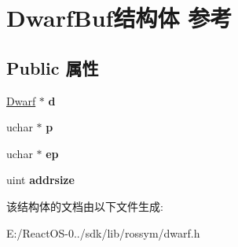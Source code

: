 \hypertarget{struct_dwarf_buf}{}\section{Dwarf\+Buf结构体 参考}
\label{struct_dwarf_buf}
\subsection*{Public 属性}
\begin{DoxyCompactItemize}
\item 
\mbox{\label{struct_dwarf_buf_a684eef7cde585d79dd3355c5780638a1}} 
\hyperlink{struct_dwarf}{Dwarf} $\ast$ {\bfseries d}
\item 
\mbox{\label{struct_dwarf_buf_a6b26aa12dbb4d05bd0f03b82ecdf1c4e}} 
uchar $\ast$ {\bfseries p}
\item 
\mbox{\label{struct_dwarf_buf_a9c0b3edaef1b1b8a8e2ccbdb187c8ba9}} 
uchar $\ast$ {\bfseries ep}
\item 
\mbox{\label{struct_dwarf_buf_a280826381e790b7767b2031ea90ffe90}} 
uint {\bfseries addrsize}
\end{DoxyCompactItemize}


该结构体的文档由以下文件生成\+:\begin{DoxyCompactItemize}
\item 
E\+:/\+React\+O\+S-\/0../sdk/lib/rossym/dwarf.\+h\end{DoxyCompactItemize}

